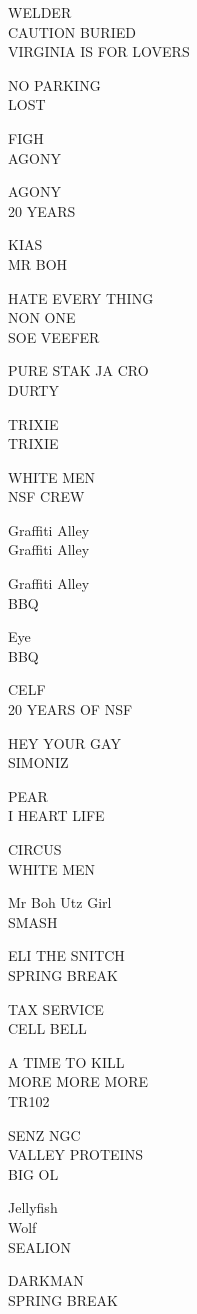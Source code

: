 \documentclass[10pt,letterpaper]{article}
\begin{document}
WELDER\\
CAUTION BURIED\\
VIRGINIA IS FOR LOVERS

NO PARKING\\
LOST

FIGH\\
AGONY

AGONY\\
20 YEARS

KIAS\\
MR BOH

HATE EVERY THING\\
NON ONE\\
SOE VEEFER

PURE STAK JA CRO\\
DURTY

TRIXIE\\
TRIXIE

WHITE MEN\\
NSF CREW

Graffiti Alley\\
Graffiti Alley

Graffiti Alley\\
BBQ

Eye\\
BBQ

CELF\\
20 YEARS OF NSF

HEY YOUR GAY\\
SIMONIZ

PEAR\\
I HEART LIFE

CIRCUS\\
WHITE MEN

Mr Boh Utz Girl\\
SMASH

ELI THE SNITCH\\
SPRING BREAK

TAX SERVICE\\
CELL BELL

A TIME TO KILL\\
MORE MORE MORE\\
TR102

SENZ NGC\\
VALLEY PROTEINS\\
BIG OL

Jellyfish\\
Wolf\\
SEALION

DARKMAN\\
SPRING BREAK
\end{document}
